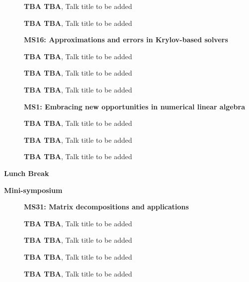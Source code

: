 \documentclass[ILAS2025-program.tex]{subfiles}
\begin{document}
\begin{description}
\begin{description}
        \item[] \textbf{TBA TBA}, Talk title to be added
        \item[] \textbf{TBA TBA}, Talk title to be added
        \end{description}
    \begin{description}
    \item[] \textbf{MS16: Approximations and errors in Krylov-based solvers} 
    \item[] \textbf{TBA TBA}, Talk title to be added
        \item[] \textbf{TBA TBA}, Talk title to be added
        \item[] \textbf{TBA TBA}, Talk title to be added
        \end{description}
    \begin{description}
    \item[] \textbf{MS1: Embracing new opportunities in numerical linear algebra} 
    \item[] \textbf{TBA TBA}, Talk title to be added
        \item[] \textbf{TBA TBA}, Talk title to be added
        \item[] \textbf{TBA TBA}, Talk title to be added
        \end{description}
    \item[\info{12:00\textrm{--}13:30}] \textbf{Lunch Break} \info{}
    \item[\info{13:30\textrm{--}15:30}] \textbf{Mini-symposium} 
    \begin{description}
    \item[] \textbf{MS31: Matrix decompositions and applications} 
    \item[] \textbf{TBA TBA}, Talk title to be added
        \item[] \textbf{TBA TBA}, Talk title to be added
        \item[] \textbf{TBA TBA}, Talk title to be added
        \item[] \textbf{TBA TBA}, Talk title to be added
        \end{description}
    \begin{description}

\end{description}
\end{description}
\end{document}

